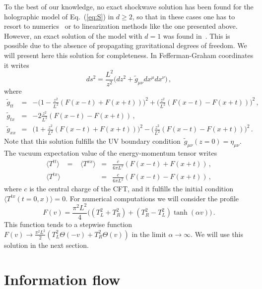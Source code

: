 \documentclass[epj]{webofc}
\begin{document}
To the best of our knowledge, no exact shockwave solution has been found for the holographic model of Eq.~(\ref{eq:S}) in $d \geq 2$, so that in these cases one has to resort to numerics~\cite{Amado:2015uza} or to linearization methods like the one presented above. However, an exact solution of the model with $d=1$ was found in~\cite{Bhaseen:2013ypa}. This is possible due to the absence of propagating gravitational degrees of freedom. We will present here this solution for completeness. In Fefferman-Graham coordinates it writes
\begin{equation}
ds^2 = \frac{L^2}{z^2} \Big( dz^2 + \tilde{g}_{\mu\nu} dx^\mu dx^\nu \Big) \,, \label{eq:FG}
\end{equation}
where 
\begin{eqnarray}
\tilde{g}_{tt} &=& -\bigg(1-\frac{z^2}{L^2}\left( F(x-t) + F(x+t) \right)\bigg)^2  +  \bigg( \frac{z^2}{L^2}\left( F(x-t) - F(x+t) \right) \bigg)^2  \,,  \\
\tilde{g}_{tx} &=&   -2 \frac{z^2}{L^2}\left( F(x-t) - F(x+t) \right)  \,,  \\
\tilde{g}_{xx} &=& \bigg(1+\frac{z^2}{L^2}\left( F(x-t) + F(x+t) \right)\bigg)^2  -  \bigg( \frac{z^2}{L^2}\left( F(x-t) - F(x+t) \right) \bigg)^2  \,. \label{eq:gxx}
\end{eqnarray}
Note that this solution fulfills the UV boundary condition~$\tilde{g}_{\mu\nu}(z=0) = \eta_{\mu\nu}$. The vacuum expectation value of the energy-momentum tensor writes
\begin{eqnarray}
\langle T^{tt} \rangle \;\;\; = \;\;\; \langle T^{xx}\rangle  &=&  \frac{c}{6\pi L^2} \left( F(x-t) + F(x+t) \right)   \,, \\
\langle T^{tx} \rangle &=& \frac{c}{6\pi L^2} \left( F(x-t) - F(x+t) \right) \,, 
\end{eqnarray}
where $c$ is the central charge of the CFT, and it fulfills the initial condition $\langle T^{tx}(t=0,x)\rangle = 0$. For numerical computations we will consider the profile
\begin{equation}
F(v) = \frac{\pi^2 L^2}{4} \Big( (T_L^2 + T_R^2) + (T_R^2 - T_L^2) \tanh(\alpha v) \Big) \,. \label{eq:F}
\end{equation}
This function tends to a stepwise function $F(v) \to \frac{\pi^2 L^2}{2} \left( T_L^2 \Theta(-v) + T_R^2 \Theta(v) \right)$ in the limit $\alpha \to \infty$. We will use this solution in the next section.





\section{Information flow}
\label{sec:Information_Flow}
\end{document}
